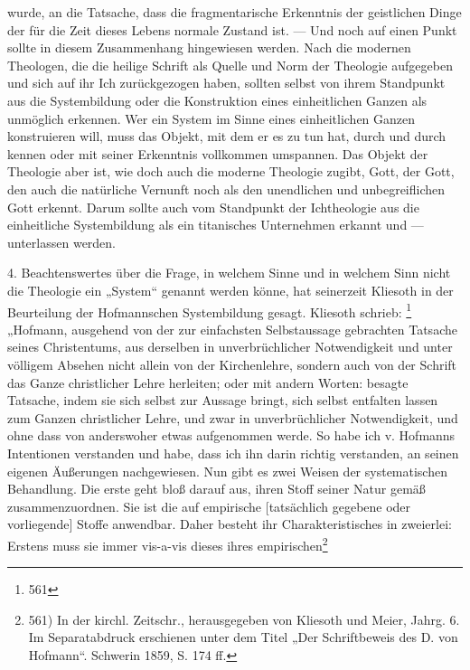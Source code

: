 wurde, an die Tatsache, dass die fragmentarische Erkenntnis der geistlichen Dinge der für die Zeit dieses Lebens normale Zustand ist. --- Und noch auf einen Punkt sollte in diesem Zusammenhang hingewiesen werden. Nach die modernen Theologen, die die heilige Schrift als Quelle und Norm der Theologie aufgegeben und sich auf ihr Ich zurückgezogen haben, sollten selbst von ihrem Standpunkt aus die Systembildung oder die Konstruktion eines einheitlichen Ganzen als unmöglich erkennen. Wer ein System im Sinne eines einheitlichen Ganzen konstruieren will, muss das Objekt, mit dem er es zu tun hat, durch und durch kennen oder mit seiner Erkenntnis vollkommen umspannen. Das Objekt der Theologie aber ist, wie doch auch die moderne Theologie zugibt, Gott, der Gott, den auch die natürliche Vernunft noch als den unendlichen und unbegreiflichen Gott erkennt. Darum sollte auch vom Standpunkt der Ichtheologie aus die einheitliche Systembildung als ein titanisches Unternehmen erkannt und --- unterlassen werden.\par 4. Beachtenswertes über die Frage, in welchem Sinne und in welchem Sinn nicht die Theologie ein „System“ genannt werden könne, hat seinerzeit Kliesoth in der Beurteilung der Hofmannschen Systembildung gesagt. Kliesoth schrieb: \footnote{561} „Hofmann, ausgehend von der zur einfachsten Selbstaussage gebrachten Tatsache seines Christentums, aus derselben in unverbrüchlicher Notwendigkeit und unter völligem Absehen nicht allein von der Kirchenlehre, sondern auch von der Schrift das Ganze christlicher Lehre herleiten; oder mit andern Worten: besagte Tatsache, indem sie sich selbst zur Aussage bringt, sich selbst entfalten lassen zum Ganzen christlicher Lehre, und zwar in unverbrüchlicher Notwendigkeit, und ohne dass von anderswoher etwas aufgenommen werde. So habe ich v. Hofmanns Intentionen verstanden und habe, dass ich ihn darin richtig verstanden, an seinen eigenen Äußerungen nachgewiesen. Nun gibt es zwei Weisen der systematischen Behandlung. Die erste geht bloß darauf aus, ihren Stoff seiner Natur gemäß zusammenzuordnen. Sie ist die auf empirische [tatsächlich gegebene oder vorliegende] Stoffe anwendbar. Daher besteht ihr Charakteristisches in zweierlei: Erstens muss sie immer vis-a-vis dieses ihres empirischen\footnote{561) In der kirchl. Zeitschr., herausgegeben von Kliesoth und Meier, Jahrg. 6. Im Separatabdruck erschienen unter dem Titel „Der Schriftbeweis des D. von Hofmann“. Schwerin 1859, S. 174 ff.}